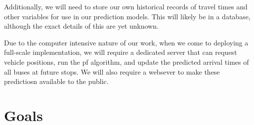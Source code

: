 \documentclass[12pt,a4paper]{article}
\begin{document}
Additionally, we will need to store our own historical records of travel times and other
variables for use in our prediction models. 
This will likely be in a database, although the exact details of this are yet unknown.


Due to the computer intensive nature of our work, 
when we come to deploying a full-scale implementation,
we will require a dedicated server that can request vehicle positions,
run the \gls{pf} algorithm,
and update the predicted arrival times of all buses at future stops.
We will also require a websever to make these predictiosn available to the public.





\section{Goals}












\end{document}
